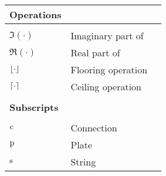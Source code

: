 {\begin{longtable}{ p{2cm} p{6.5cm} p{2.5cm}  }
 \\
    \hline {\bf Operations}\\\hline
 \\
 $\mathfrak{I}(\cdot)$ & Imaginary part of &\\
 $\mathfrak{R}(\cdot)$ & Real part of & \\
 $\floor[\cdot]$ & Flooring operation &\\
 $\ceil[\cdot]$ & Ceiling operation &\\
 \\\hline
 {\bf Subscripts}\\\hline
 \\
 $\text{c}$ & Connection &\\
 $\text{p}$ & Plate &\\
 $\text{s}$ & String &
\end{longtable}}